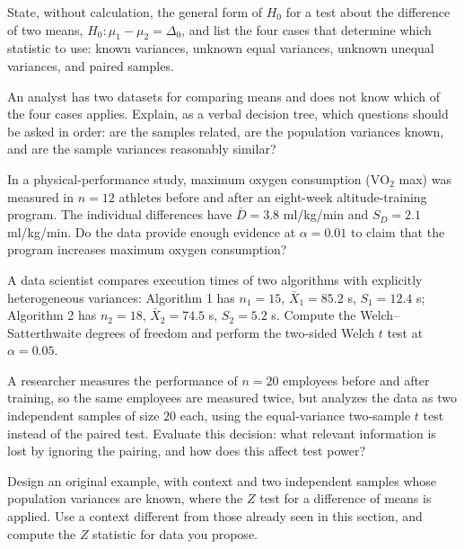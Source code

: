 \begin{problema}\label{prob:16e7075}
State, without calculation, the general form of $H_0$ for a test about the difference of two means, $H_0:\mu_1-\mu_2=\Delta_0$, and list the four cases that determine which statistic to use: known variances, unknown equal variances, unknown unequal variances, and paired samples.
\end{problema}

\begin{problema}\label{prob:b9ad2de}
An analyst has two datasets for comparing means and does not know which of the four cases applies. Explain, as a verbal decision tree, which questions should be asked in order: are the samples related, are the population variances known, and are the sample variances reasonably similar?
\end{problema}

\begin{problema}\label{prob:b0c0618}
In a physical-performance study, maximum oxygen consumption ($\text{VO}_2$ max) was measured in $n=12$ athletes before and after an eight-week altitude-training program. The individual differences have $\bar D=3.8$ ml/kg/min and $S_D=2.1$ ml/kg/min. Do the data provide enough evidence at $\alpha=0.01$ to claim that the program increases maximum oxygen consumption?
\end{problema}

\begin{problema}\label{prob:f2e4336}
A data scientist compares execution times of two algorithms with explicitly heterogeneous variances: Algorithm 1 has $n_1=15$, $\bar X_1=85.2$ s, $S_1=12.4$ s; Algorithm 2 has $n_2=18$, $\bar X_2=74.5$ s, $S_2=5.2$ s. Compute the Welch--Satterthwaite degrees of freedom and perform the two-sided Welch $t$ test at $\alpha=0.05$.
\end{problema}

\begin{problema}\label{prob:bf23a02}
A researcher measures the performance of $n=20$ employees before and after training, so the same employees are measured twice, but analyzes the data as two independent samples of size $20$ each, using the equal-variance two-sample $t$ test instead of the paired test. Evaluate this decision: what relevant information is lost by ignoring the pairing, and how does this affect test power?
\end{problema}

\begin{problema}\label{prob:7fe0aa3}
Design an original example, with context and two independent samples whose population variances are known, where the $Z$ test for a difference of means is applied. Use a context different from those already seen in this section, and compute the $Z$ statistic for data you propose.
\end{problema}

